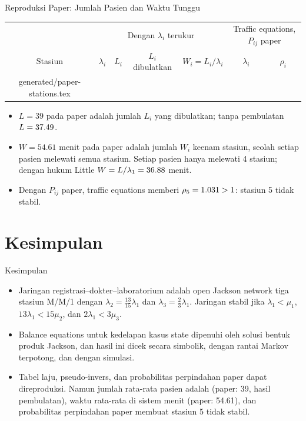 \documentclass[aspectratio=169]{beamer}
\makeatletter
\newcommand{\tablerows}[1]{\@@input generated/#1.tex }
\makeatother
\begin{document}
\begin{frame}{Reproduksi Paper: Jumlah Pasien dan Waktu Tunggu}
    \begin{table}
        \footnotesize
        \begin{tabular}{ccccc|cc}
            \toprule
            & \multicolumn{4}{c|}{Dengan $\lambda_i$ terukur} & \multicolumn{2}{c}{Traffic equations, $P_{ij}$ paper} \\
            Stasiun & $\lambda_i$ & $L_i$ & $L_i$ dibulatkan & $W_i = L_i/\lambda_i$ & $\lambda_i$ & $\rho_i$ \\
            \midrule
            \tablerows{paper-stations}
            \bottomrule
        \end{tabular}
    \end{table}
    \footnotesize
    \begin{itemize}
        \item $L = 39$ pada paper adalah jumlah $L_i$ yang dibulatkan; tanpa pembulatan $L = 37.49$.
        \item $W = 54.61$ menit pada paper adalah jumlah $W_i$ keenam stasiun, seolah setiap pasien melewati semua stasiun. Setiap pasien hanya melewati 4 stasiun; dengan hukum Little $W = L/\lambda_1 = 36.88$ menit.
        \item Dengan $P_{ij}$ paper, traffic equations memberi $\rho_5 = 1.031 > 1$: stasiun 5 tidak stabil.
    \end{itemize}
\end{frame}


\section{\color{mygreen}\huge Kesimpulan}
\begin{frame}{Kesimpulan}
    \begin{itemize}
        \item Jaringan registrasi--dokter--laboratorium adalah open Jackson network tiga stasiun M/M/1 dengan $\lambda_2 = \tfrac{13}{15}\lambda_1$ dan $\lambda_3 = \tfrac23\lambda_1$. Jaringan stabil jika $\lambda_1 < \mu_1$, $13\lambda_1 < 15\mu_2$, dan $2\lambda_1 < 3\mu_3$.
        \item Balance equations untuk kedelapan kasus state dipenuhi oleh solusi bentuk produk Jackson, dan hasil ini dicek secara simbolik, dengan rantai Markov terpotong, dan dengan simulasi.
        \item Tabel laju, pseudo-invers, dan probabilitas perpindahan paper dapat direproduksi. Namun jumlah rata-rata pasien adalah \PaperL{} (paper: 39, hasil pembulatan), waktu rata-rata di sistem \PaperWLittle{} menit (paper: 54.61), dan probabilitas perpindahan paper membuat stasiun 5 tidak stabil.
    \end{itemize}
\end{frame}


\end{document}
